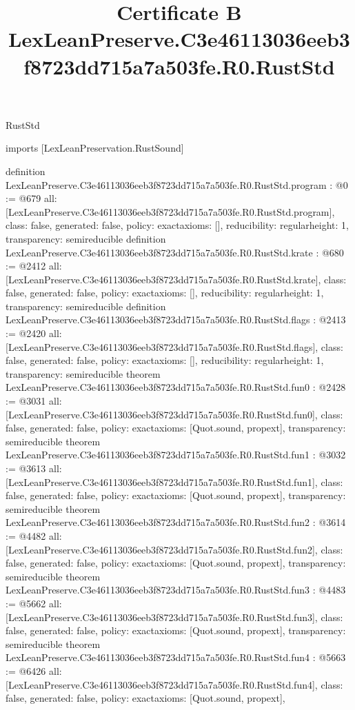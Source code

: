 \begin{lexlean}{RustStd}
\title{Certificate B LexLeanPreserve.C3e46113036eeb3f8723dd715a7a503fe.R0.RustStd}
\begin{coremodule}
imports [LexLeanPreservation.RustSound]

definition LexLeanPreserve.C3e46113036eeb3f8723dd715a7a503fe.R0.RustStd.program : @0 := @679 {
  all: [LexLeanPreserve.C3e46113036eeb3f8723dd715a7a503fe.R0.RustStd.program],
  class: false,
  generated: false,
  policy: exact{axioms: []},
  reducibility: regular{height: 1},
  transparency: semireducible
}
definition LexLeanPreserve.C3e46113036eeb3f8723dd715a7a503fe.R0.RustStd.krate : @680 := @2412 {
  all: [LexLeanPreserve.C3e46113036eeb3f8723dd715a7a503fe.R0.RustStd.krate],
  class: false,
  generated: false,
  policy: exact{axioms: []},
  reducibility: regular{height: 1},
  transparency: semireducible
}
definition LexLeanPreserve.C3e46113036eeb3f8723dd715a7a503fe.R0.RustStd.flags : @2413 := @2420 {
  all: [LexLeanPreserve.C3e46113036eeb3f8723dd715a7a503fe.R0.RustStd.flags],
  class: false,
  generated: false,
  policy: exact{axioms: []},
  reducibility: regular{height: 1},
  transparency: semireducible
}
theorem LexLeanPreserve.C3e46113036eeb3f8723dd715a7a503fe.R0.RustStd.fun0 : @2428 := @3031 {
  all: [LexLeanPreserve.C3e46113036eeb3f8723dd715a7a503fe.R0.RustStd.fun0],
  class: false,
  generated: false,
  policy: exact{axioms: [Quot.sound, propext]},
  transparency: semireducible
}
theorem LexLeanPreserve.C3e46113036eeb3f8723dd715a7a503fe.R0.RustStd.fun1 : @3032 := @3613 {
  all: [LexLeanPreserve.C3e46113036eeb3f8723dd715a7a503fe.R0.RustStd.fun1],
  class: false,
  generated: false,
  policy: exact{axioms: [Quot.sound, propext]},
  transparency: semireducible
}
theorem LexLeanPreserve.C3e46113036eeb3f8723dd715a7a503fe.R0.RustStd.fun2 : @3614 := @4482 {
  all: [LexLeanPreserve.C3e46113036eeb3f8723dd715a7a503fe.R0.RustStd.fun2],
  class: false,
  generated: false,
  policy: exact{axioms: [Quot.sound, propext]},
  transparency: semireducible
}
theorem LexLeanPreserve.C3e46113036eeb3f8723dd715a7a503fe.R0.RustStd.fun3 : @4483 := @5662 {
  all: [LexLeanPreserve.C3e46113036eeb3f8723dd715a7a503fe.R0.RustStd.fun3],
  class: false,
  generated: false,
  policy: exact{axioms: [Quot.sound, propext]},
  transparency: semireducible
}
theorem LexLeanPreserve.C3e46113036eeb3f8723dd715a7a503fe.R0.RustStd.fun4 : @5663 := @6426 {
  all: [LexLeanPreserve.C3e46113036eeb3f8723dd715a7a503fe.R0.RustStd.fun4],
  class: false,
  generated: false,
  policy: exact{axioms: [Quot.sound, propext]},
}
\end{coremodule}
\end{lexlean}
